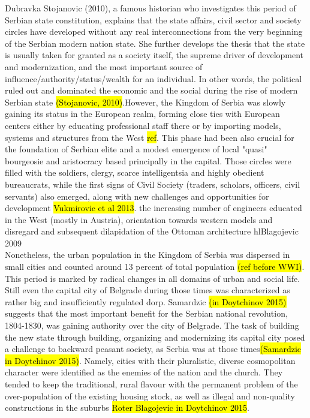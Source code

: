 \documentclass[11pt]{report}
\begin{document}
Dubravka Stojanovic (2010), a famous historian who investigates this period of Serbian state constitution, explains that the state affairs, civil sector and society circles have developed without any real interconnections from the very beginning of the Serbian modern nation state. She further develops the thesis that the state is usually taken for granted as a society itself, the supreme driver of development and modernization, and the most important source of influence/authority/status/wealth for an individual. In other words, the political ruled out and dominated the economic and the social during the rise of modern Serbian state \hl{(Stojanovic, 2010)}.\footnotemark However, the Kingdom of Serbia was slowly gaining its status in the European realm, forming close ties with European centers either by educating professional staff there or by importing models, systems and structures from the West \hl{ref}. This phase had been also crucial for the foundation of Serbian elite and a modest emergence of local "quasi" bourgeosie and aristocracy based principally in the capital. Those circles were filled with the soldiers, clergy, scarce intelligentsia and highly obedient bureaucrats, while the  first  signs  of  Civil  Society (traders, scholars, officers, civil servants) also emerged, along with new challenges and  opportunities  for  development \hl{Vukmirovic et al 2013}.
the increasing number of engineers educated in the West (mostly in 
Austria), orientation towards western models and disregard and subsequent dilapidation of the Ottoman architecture hl{Blagojevic 2009}
\\
Nonetheless, the urban population in the Kingdom of Serbia was dispersed in small cities and counted around 13 percent of total population \hl{(ref before WWI)}. This period is marked by radical changes in all domains of urban and social life. Still even the capital city of Belgrade during those times was characterized as rather big and insufficiently regulated dorp. Samardzic \hl{(in Doytchinov 2015)} suggests that the most important benefit for the Serbian national revolution, 1804-1830, was gaining authority over the city of Belgrade. The task of building the new state through building, organizing and modernizing its capital city posed a challenge to backward peasant society, as Serbia was at those times\hl{(Samardzic in Doytchinov 2015)}. Namely, cities with their pluralistic, diverse cosmopolitan character were identified as the enemies of the nation and the church. They tended to keep the traditional, rural flavour with the permanent problem of the over-population of the existing housing stock, as well as illegal and non-quality constructions in the suburbs \hl{Roter Blagojevic in Doytchinov 2015}.
\end{document}
